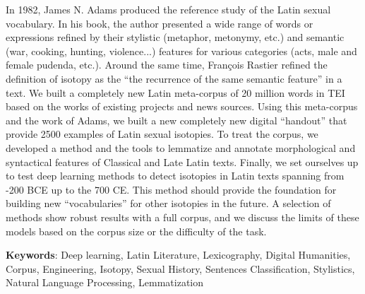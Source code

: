 In 1982, James N. Adams produced the reference study of the Latin sexual vocabulary. In his book, the author presented a wide range of words or expressions refined by their stylistic (metaphor, metonymy, etc.) and semantic (war, cooking, hunting, violence...) features for various categories (acts, male and female pudenda, etc.). Around the same time, François Rastier refined the definition of isotopy as the “the recurrence of the same semantic feature” in a text. We built a completely new Latin meta-corpus of 20 million words in TEI based on the works of existing projects and news sources. Using this meta-corpus and the work of Adams, we built a new completely new digital “handout” that provide 2500 examples of Latin sexual isotopies. To treat the corpus, we developed a method and the tools to lemmatize and annotate morphological and syntactical features of Classical  and Late Latin texts. Finally, we set ourselves up to test deep learning methods to detect isotopies in Latin texts spanning from -200 BCE up to the 700 CE. This method should provide the foundation for building new “vocabularies” for other isotopies in the future. A selection of methods show robust results with a full corpus, and we discuss the limits of these models based on the corpus size or the difficulty of the task.

\noindent\textbf{Keywords}: Deep learning, Latin Literature, Lexicography, Digital Humanities, Corpus, Engineering, Isotopy, Sexual History, Sentences Classification, Stylistics, Natural Language Processing, Lemmatization